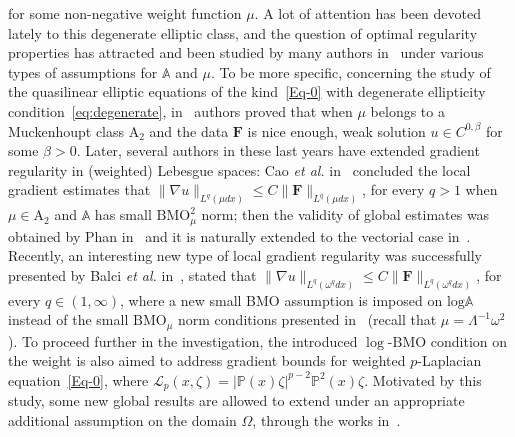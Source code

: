 \documentclass[a4paper, 11pt]{article}
\begin{document}
for some non-negative weight function $\mu$. A lot of attention has been devoted lately to this degenerate elliptic class, and the question of optimal regularity properties has attracted and been studied by many authors in~\cite{FKS1982, CMP2018, CMP2019, BDGN2022, BBDL2023} under various types of assumptions for $\mathbb{A}$ and $\mu$. To be more specific, concerning the study of the quasilinear elliptic equations of the kind~\eqref{Eq-0} with degenerate ellipticity condition~\eqref{eq:degenerate}, in~\cite{FKS1982} authors proved that when $\mu$ belongs to a Muckenhoupt class $\mathrm{A}_2$ and the data $\mathbf{F}$ is nice enough, weak solution $u \in C^{0,\beta}$ for some $\beta>0$. Later, several authors in these last years have extended gradient regularity in (weighted) Lebesgue spaces: Cao \emph{et al.} in~\cite{CMP2018} concluded the local gradient estimates that $\|\nabla u\|_{L^q(\mu dx)} \le C \|\mathbf{F}\|_{L^q(\mu dx)}$, for every $q>1$ when $\mu \in \mathrm{A}_2$ and $\mathbb{A}$ has small $\mathrm{BMO}_\mu^2$ norm; then the validity of global estimates was obtained by Phan in~\cite{Phan2020} and it is naturally extended to the vectorial case in~\cite{CMP2019}. Recently, an interesting new type of local gradient regularity was successfully presented by Balci \emph{et al.} in~\cite{BDGN2022}, stated that $\|\nabla u\|_{L^q(\omega^q dx)} \le C \|\mathbf{F}\|_{L^q(\omega^q dx)}$, for every $q \in (1,\infty)$, where a new small BMO assumption is imposed on $\mathrm{log}\mathbb{A}$ instead of the small $\mathrm{BMO}_\mu$ norm conditions presented in~\cite{CMP2018} (recall that $\mu = \Lambda^{-1}\omega^2$). To proceed further in the investigation, the introduced $\log$-$\mathrm{BMO}$ condition on the weight is also aimed to address gradient bounds for weighted $p$-Laplacian equation~\eqref{Eq-0}, where $\mathcal{L}_p(x,\zeta)= |\mathbb{P}(x)\zeta|^{p-2}\mathbb{P}^2(x)\zeta$.  Motivated by this study, some new global results are allowed to extend under an appropriate additional assumption on the domain $\Omega$, through the works in~\cite{BBDL2023, BC2024}. 
\end{document}
